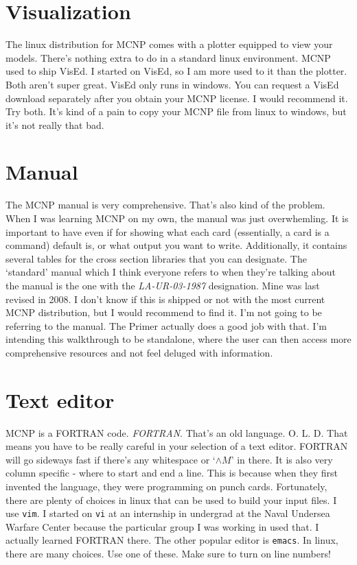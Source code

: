 \documentclass[11pt,a4paper]{article}
\begin{document}
\section{Visualization}
\noindent The linux distribution for MCNP comes with a plotter equipped to view your models. There's nothing extra to do in a standard linux environment. MCNP used to ship VisEd. I started on VisEd, so I am more used to it than the plotter. Both aren't super great. VisEd only runs in windows. You can request a VisEd download separately after you obtain your MCNP license. I would recommend it. Try both. It's kind of a pain to copy your MCNP file from linux to windows, but it's not really that bad.

\section{Manual}
\noindent The MCNP manual is very comprehensive. That's also kind of the problem. When I was learning MCNP on my own, the manual was just overwhemling. It is important to have even if for showing what each card (essentially, a card is a command) default is, or what output you want to write. Additionally, it contains several tables for the cross section libraries that you can designate. The `standard' manual which I think everyone refers to when they're talking about the manual is the one with the \textit{LA-UR-03-1987} designation. Mine was last revised in 2008. I don't know if this is shipped or not with the most current MCNP distribution, but I would recommend to find it. I'm not going to be referring to the manual. The Primer actually does a good job with that. I'm intending this walkthrough to be standalone, where the user can then access more comprehensive resources and not feel deluged with information.

\section{Text editor}
\noindent MCNP is a FORTRAN code. \textit{FORTRAN}. That's an old language. O. L. D. That means you have to be really careful in your selection of a text editor. FORTRAN will go sideways fast if there's any whitespace or `$\wedge M$' in there. It is also very column specific - where to start and end a line. This is because when they first invented the language, they were programming on punch cards. Fortunately, there are plenty of choices in linux that can be used to build your input files. I use \texttt{vim}. I started on \texttt{vi} at an internship in undergrad at the Naval Undersea Warfare Center because the particular group I was working in used that. I actually learned FORTRAN there. The other popular editor is \texttt{emacs}. In linux, there are many choices. Use one of these. Make sure to turn on line numbers!
\end{document}
